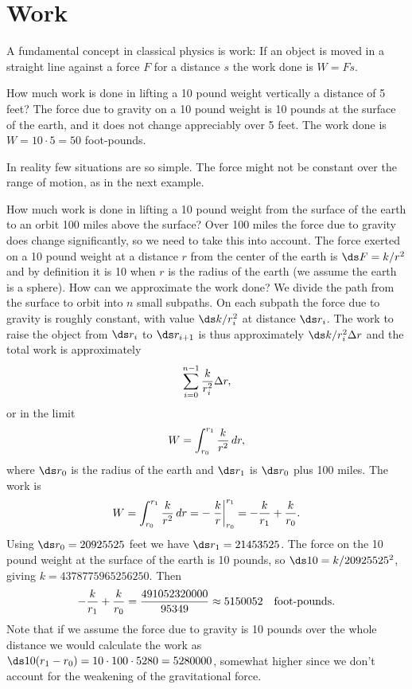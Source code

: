 \section{Work}{}{}
\nobreak
A fundamental concept in classical physics is {\dfont
work\/}: If an object is moved in a straight line against
a force $F$ for a distance $s$ the work done is $W=Fs$.

\begin{example}
How much work is done in lifting a 10 pound weight vertically a
distance of 5 feet? The force due to gravity on a 10 pound weight is
10 pounds at the surface of the earth, and it does not change
appreciably over 5 feet. The work done is $W=10\cdot 5=50$ foot-pounds.
\end{example}

In reality few situations are so simple. The force might not be
constant over the range of motion, as in the next example.

\begin{example} How much work is done in lifting a 10 pound weight from the
surface of the earth to an orbit 100 miles above the surface? Over 100
miles the force due to gravity does change significantly, so we need
to take this into account. The force exerted on a 10 pound weight at a
distance $r$ from the center of the earth is $\ds F=k/r^2$ and by
definition it is 10 when $r$ is the radius of the earth (we assume the
earth is a sphere). How can we approximate the work done? We divide
the path from the surface to orbit into $n$ small subpaths. On each
subpath the force due to gravity is roughly constant, with value
$\ds k/r_i^2$ at distance $\ds r_i$. The work to raise the object from
$\ds r_i$ to $\ds r_{i+1}$ is thus approximately $\ds k/r_i^2\Delta r$ and the
total work is approximately
$$\sum_{i=0}^{n-1} {k\over r_i^2}\Delta r,$$
or in the limit
$$W=\int_{r_0}^{r_1} {k\over r^2}\,dr,$$
where $\ds r_0$ is the radius of the earth and $\ds r_1$ is $\ds r_0$ plus 100
miles. The work is
$$W=\int_{r_0}^{r_1} {k\over r^2}\,dr=
-\left.{k\over r}\right|_{r_0}^{r_1}=-{k\over r_1}+{k\over r_0}.$$
Using $\ds r_0=20925525$ feet we have $\ds r_1=21453525$. The force on the 10
pound weight at the surface of the earth is 10 pounds, so 
$\ds 10=k/20925525^2$, giving $k=4378775965256250$. Then
$$-{k\over r_1}+{k\over r_0}={491052320000\over 95349}\approx 5150052
\quad\hbox{foot-pounds}.$$
Note that if we assume the force due to gravity is 10 pounds over the
whole distance we would calculate the work as $\ds 10(r_1-r_0)=10\cdot100\cdot
5280=5280000$, somewhat higher since we don't account for the
weakening of the gravitational force.
\end{example}

